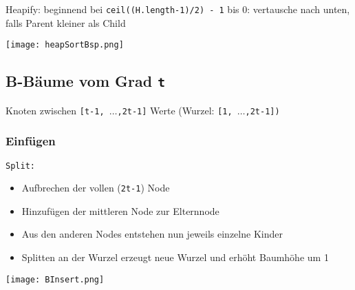 \noindent
Heapify: beginnend bei \texttt{ceil((H.length-1)/2) - 1} bis 0: vertausche nach unten, falls Parent kleiner als Child
\centerline{\texttt{[image: heapSortBsp.png]}}

\subsection*{B-Bäume vom Grad \texttt{t}}
\centerline{Knoten zwischen \texttt{[t-1, $\dots$,2t-1]} Werte (Wurzel: \texttt{[1, $\dots$,2t-1])}} 
\subsubsection*{Einfügen}
\texttt{Split:}
    \begin{itemize}
        \item Aufbrechen der vollen (\texttt{2t-1}) Node
        \item Hinzufügen der mittleren Node zur Elternnode
        \item Aus den anderen Nodes entstehen nun jeweils einzelne Kinder
        \item Splitten an der Wurzel erzeugt neue Wurzel und erhöht Baumhöhe um 1
    \end{itemize}

\centerline{\texttt{[image: BInsert.png]}}

